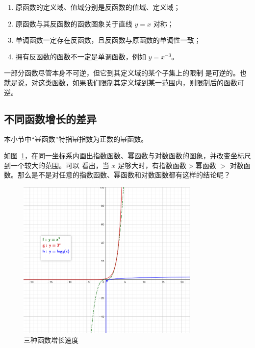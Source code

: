 \documentclass[a4paper,openany]{ctexbook}
\begin{document}
\begin{enumerate}
    \item 原函数的定义域、值域分别是反函数的值域、定义域；
    \item 原函数与其反函数的函数图象关于直线 \(y=x\) 对称；
    \item 单调函数一定存在反函数，且反函数与原函数的单调性一致；
    \item 拥有反函数的函数不一定是单调函数，例如 \(y=x^{-3}\)。
\end{enumerate}

一部分函数尽管本身不可逆，但它到其定义域的某个子集上的限制%
是可逆的。也就是说，对这类函数，如果我们限制其定义域到某一范围内，则限制后的函数可逆。

\subsection{不同函数增长的差异}

本小节中“幂函数”特指幂指数为正数的幂函数。

如图~\ref{fgr:sjvshjuuzgvhsudu}，在同一坐标系内画出指数函数、幂函数与对数函数的图象，并改变坐标尺到一个较大的范围。可以
看出，当 \(x\) 足够大时，有指数函数\(>\)幂函数 \(>\) 对数函数。那么是不是对任意的指数函数、幂函数和对数函数都有这样的结论呢？

\begin{figure}
    \centering
    \includegraphics[width=0.8\textwidth]{image33.png}
    \caption{三种函数增长速度}\label{fgr:sjvshjuuzgvhsudu}
\end{figure}
\end{document}
